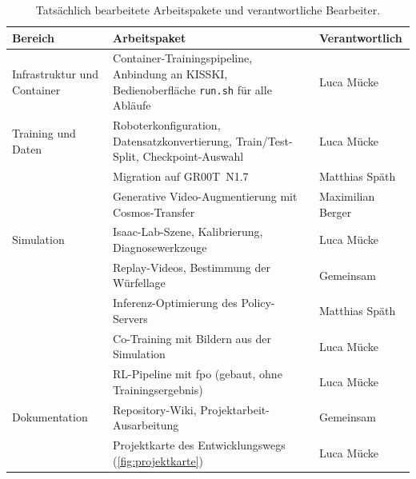 \begin{table}[H]
  \centering
  \small
  \begin{tabularx}{\linewidth}{>{\raggedright\arraybackslash}p{2.5cm}>{\raggedright\arraybackslash}X>{\raggedright\arraybackslash}p{3.1cm}}
    \toprule
    Bereich & Arbeitspaket & Verantwortlich \\
    \midrule
    Infrastruktur und Container & Container-Trainingspipeline, Anbindung an KISSKI, Bedienoberfläche \texttt{run.sh} für alle Abläufe
       & Luca Mücke \\
    \midrule
    Training und Daten & Roboterkonfiguration, Datensatzkonvertierung, Train/Test-Split,
      Checkpoint-Auswahl & Luca Mücke \\
      & Migration auf GR00T~N1.7 & Matthias Späth \\
      & Generative Video-Augmentierung mit Cosmos-Transfer & Maximilian Berger \\
    \midrule
    Simulation & Isaac-Lab-Szene, Kalibrierung,
      Diagnosewerkzeuge & Luca Mücke \\
      & Replay-Videos, Bestimmung der Würfellage & Gemeinsam \\
      & Inferenz-Optimierung des Policy-Servers & Matthias Späth \\
      & Co-Training mit Bildern aus der Simulation & Luca Mücke \\
      & RL-Pipeline mit \acs{fpo} (gebaut, ohne Trainingsergebnis) & Luca Mücke \\
    \midrule
     Dokumentation & Repository-Wiki, Projektarbeit-Ausarbeitung & Gemeinsam \\
      & Projektkarte des Entwicklungswegs (\cref{fig:projektkarte}) & Luca Mücke \\
    \bottomrule
  \end{tabularx}
  \caption{Tatsächlich bearbeitete Arbeitspakete und verantwortliche Bearbeiter.}
  \label{tab:beitraege}
\end{table}
